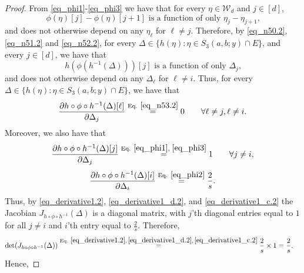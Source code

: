 \documentclass[11pt,letterpaper]{article}
\begin{document}
\begin{proof}
  \noindent  From \eqref{eq_phi1}-\eqref{eq_phi3} we have that for every $\eta \in \mathcal{W}_d$ and $j \in [d]$,
\begin{equation}\label{eq_n52.2}
\textrm{$\phi(\eta)[j]- \phi(\eta)[j+1]$ is a function of only $\eta_j- \eta_{j+1}$,}
\end{equation}
%
and does not otherwise depend on any $\eta_\ell$ for $\ell \neq j$.
%
Therefore, by \eqref{eq_n50.2}, \eqref{eq_n51.2} and \eqref{eq_n52.2},  for every $\Delta \in  \{h(\eta) :  \eta \in  S_3(a,b;y) \cap E \}$, and every $j \in [d]$, 
we have that 
%
\begin{equation}\label{eq_n53.2}
\textrm{$h(\phi(h^{-1}(\Delta)))[j]$ is a function of only $\Delta_j$,}
\end{equation}
%
 and does not otherwise depend on any $\Delta_\ell$ for $\ell \neq i$.
 Thus,  for every $\Delta \in  \{h(\eta) :  \eta \in  S_3(a,b;y) \cap E \}$, we have that
%
\begin{equation} \label{eq_derivative1.2}
    \frac{\partial h \circ \phi \circ h^{-1}(\Delta)[\ell]}{\partial \Delta_j} \stackrel{\textrm{Eq. } \eqref{eq_n53.2}}{=} 0 \qquad \forall \ell \neq j, \ell \neq i.
\end{equation}
%
 Moreover, we also have that
%
%
\begin{equation}\label{eq_derivative1_d.2}
    \frac{\partial h \circ \phi\circ h^{-1}(\Delta)[j]}{\partial \Delta_j} \stackrel{\textrm{Eq. } \eqref{eq_phi1}, \, \, \eqref{eq_phi3}}{=} 1 \qquad \forall j \neq i,
\end{equation}
%
\begin{equation}\label{eq_derivative1_c.2}
    \frac{\partial h \circ \phi\circ h^{-1}(\Delta)[i]}{\partial \Delta_i} \stackrel{\textrm{Eq. } \eqref{eq_phi2}}{=} \frac{2}{s}.
\end{equation}
%
Thus, by \eqref{eq_derivative1.2}, \eqref{eq_derivative1_d.2}, and \eqref{eq_derivative1_c.2}  the Jacobian $J_{h \circ \phi \circ h^{-1}}(\Delta)$  is a diagonal matrix, with $j$'th diagonal entries equal to $1$ for all $j \neq i$ and $i$'th entry equal to $\frac{2}{s}$.
%
Therefore,
%
\begin{align}\label{eq_g5b}
\mathrm{det}(J_{h \circ \phi \circ h^{-1}}(\Delta)) &\stackrel{\textrm{Eq. } \eqref{eq_derivative1.2},\, \eqref{eq_derivative1_d.2},\, \eqref{eq_derivative1_c.2} }{=} \frac{2}{s} \times 1 = \frac{2}{s}.
\end{align}
%
Hence,


\end{proof}
\end{document}
